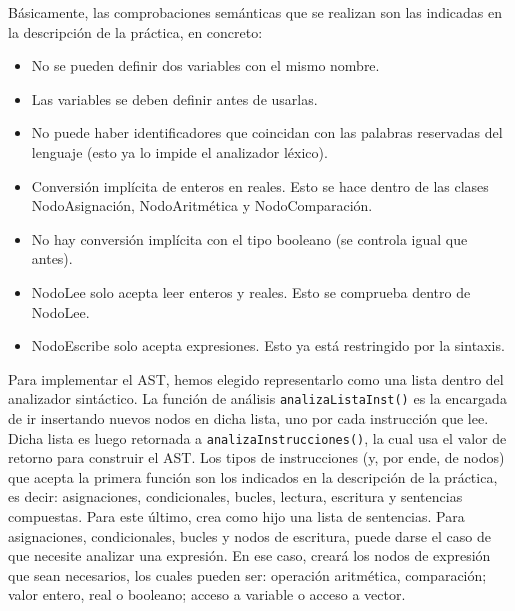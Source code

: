 \documentclass[11pt]{article}
\begin{document}
Básicamente, las comprobaciones semánticas que se realizan son las indicadas en la descripción de la práctica, en concreto:
\begin{itemize}
	\item No se pueden definir dos variables con el mismo nombre.
	\item Las variables se deben definir antes de usarlas.
	\item No puede haber identificadores que coincidan con las palabras reservadas del lenguaje (esto ya lo impide el analizador léxico).
	\item Conversión implícita de enteros en reales. Esto se hace dentro de las clases NodoAsignación, NodoAritmética y NodoComparación.
	\item No hay conversión implícita con el tipo booleano (se controla igual que antes).
	\item NodoLee solo acepta leer enteros y reales. Esto se comprueba dentro de NodoLee.
	\item NodoEscribe solo acepta expresiones. Esto ya está restringido por la sintaxis.
\end{itemize} 

Para implementar el AST, hemos elegido representarlo como una lista dentro del analizador sintáctico. La función de análisis \lstinline[language=Python]{analizaListaInst()} es la encargada de ir insertando nuevos nodos en dicha lista, uno por cada instrucción que lee. Dicha lista es luego retornada a \lstinline[language=Python]{analizaInstrucciones()}, la cual usa el valor de retorno para construir el AST. Los tipos de instrucciones (y, por ende, de nodos) que acepta la primera función son los indicados en la descripción de la práctica, es decir: asignaciones, condicionales, bucles, lectura, escritura y sentencias compuestas. Para este último, crea como hijo una lista de sentencias. Para asignaciones, condicionales, bucles y nodos de escritura, puede darse el caso de que necesite analizar una expresión. En ese caso, creará los nodos de expresión que sean necesarios, los cuales pueden ser: operación aritmética, comparación; valor entero, real o booleano; acceso a variable o acceso a vector.
\end{document}
